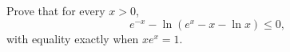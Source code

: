 Prove that for every $x>0$,
\[
e^{-x}-\ln\left(e^x-x-\ln x\right)\le0,
\]
with equality exactly when $xe^x=1$.
